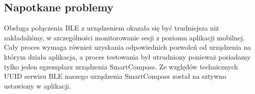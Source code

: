 \subsection{Napotkane problemy}
Obsługa połączenia BLE z urządzeniem okazała się być trudniejsza niż zakładaliśmy, w szczególności monitorowanie sesji z poziomu aplikacji mobilnej. Cały proces wymaga również uzyskania odpowiednich pozwoleń od urządzenia na którym działa aplikacja, a proces testowania był utrudniony ponieważ posiadamy tylko jeden egzemplarz urządzenia SmartCompass. Ze względów technicznych UUID serwisu BLE naszego urządzenia SmartCompass został na sztywno ustawiony w aplikacji.